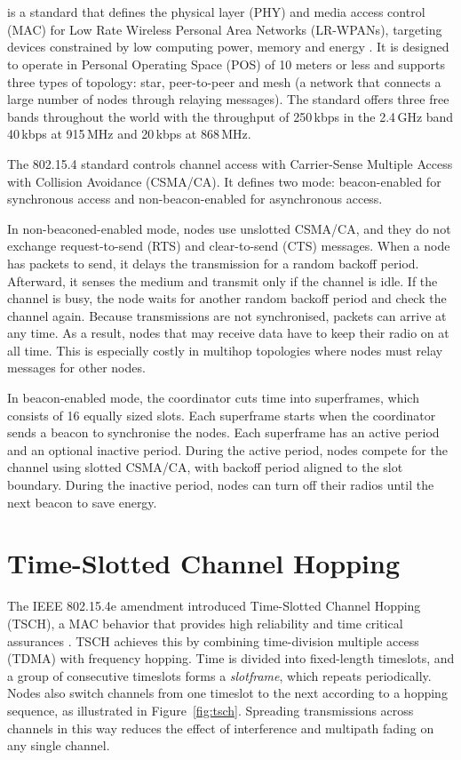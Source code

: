\section{\ieeemac{}}
\ieeemac{} is a standard that defines the physical layer
(PHY) and media access control (MAC) for Low Rate
Wireless Personal Area Networks (LR-WPANs),
targeting devices constrained by low computing
power, memory and energy \cite{salmanOverviewIEEE8021542010}. It is
designed to operate in Personal
Operating Space (POS) of 10 meters or less and supports
three types of topology: star, peer-to-peer and mesh (a network that
connects a large number of nodes through relaying messages). The
standard offers three free bands
throughout the world with the throughput of 250\,kbps in the 2.4\,GHz
band 40\,kbps at 915\,MHz and 20\,kbps at 868\,MHz.

The 802.15.4 standard controls channel access with Carrier-Sense
Multiple Access with
Collision Avoidance (CSMA/CA). It defines two mode:
beacon-enabled for synchronous access and non-beacon-enabled for
asynchronous access.

In non-beaconed-enabled mode, nodes use unslotted
CSMA/CA, and they do not exchange request-to-send (RTS) and clear-to-send (CTS)
messages. When a node has packets to send, it delays the transmission for a
random backoff period. Afterward, it senses the medium and transmit
only if the channel is idle. If the channel is busy, the node waits for
another random backoff period and check the channel again.
Because transmissions are not synchronised, packets can arrive at any
time. As a result, nodes that may receive data have to keep their
radio on at all time.
This is especially costly in multihop topologies where nodes must
relay messages for other nodes.

In beacon-enabled mode, the coordinator cuts time into superframes,
which consists of 16 equally sized slots. Each
superframe starts when the coordinator sends a beacon to synchronise
the nodes. Each superframe has an active period and an optional
inactive period. During the active period, nodes compete for the
channel using slotted CSMA/CA, with backoff period aligned to the
slot boundary. During the inactive period, nodes can turn off their
radios until the next beacon to save energy.

\section{\ieeemacE{} Time-Slotted Channel Hopping}
The IEEE 802.15.4e amendment introduced Time-Slotted Channel Hopping
(TSCH), a MAC behavior that provides high reliability and time
critical assurances \cite{tsch}. TSCH achieves this by
combining time-division multiple access (TDMA) with frequency hopping.
Time is divided into fixed-length timeslots, and a group of
consecutive timeslots forms a \emph{slotframe}, which repeats
periodically. Nodes also switch channels from one timeslot to the
next according to a hopping sequence, as illustrated in
Figure~\ref{fig:tsch}. Spreading transmissions across channels in
this way reduces the effect of interference and multipath fading on
any single channel.

